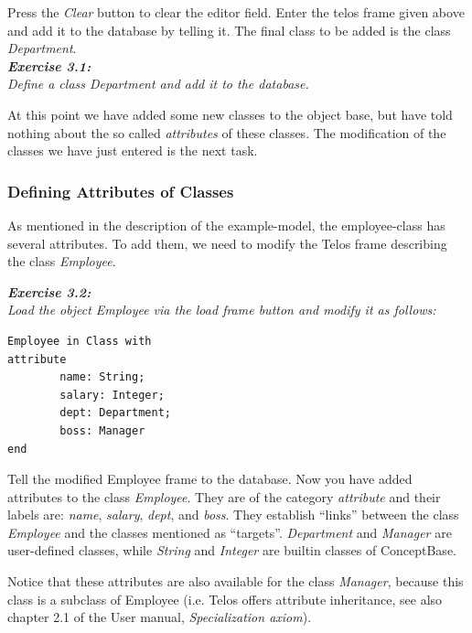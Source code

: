 \documentclass[10pt,a4paper]{article}
\begin{document}
Press the {\em Clear} button to clear the editor field.
Enter the telos frame given above and add it to the database by telling it.
The final class to be added is the class {\em Department}. \\

\vspace{0.7cm}
{\it
{\bf Exercise 3.1:}\\
Define a class {\em Department} and add it to the database. \\
}

At this point we have added some new classes to the object
base, but have told nothing about the so called {\em attributes} of these
classes.  The modification of the classes we have just entered is the
next task.


\subsubsection{Defining Attributes of Classes}

As mentioned in the description of the example-model, the employee-class
has several attributes. To add them, we need to modify the Telos frame
describing the class {\em Employee}.

\vspace{0.7cm}
{\it
{\bf Exercise 3.2:} \\
Load the object
{\em Employee} via the {\em load frame} button and
modify it as follows:
}

\begin{verbatim}
Employee in Class with
attribute
        name: String;
        salary: Integer;
        dept: Department;
        boss: Manager
end
\end{verbatim}

Tell the modified Employee frame to the database.
Now you have added attributes to the class {\em Employee}.
They are of the category {\em attribute} and  their labels are:
{\em name}, {\em salary}, {\em dept}, and {\em boss}.  They establish ``links''
between the class {\em Employee} and the classes mentioned as ``targets''.
{\em Department} and {\em Manager} are user-defined classes, while {\em String}
and {\em Integer} are builtin classes of ConceptBase. 

Notice that these attributes are also available for the class
{\em Manager}, because this class is a subclass of Employee
(i.e. Telos offers attribute inheritance, see also chapter 2.1
of the User manual, {\em Specialization axiom}).\\
\end{document}
